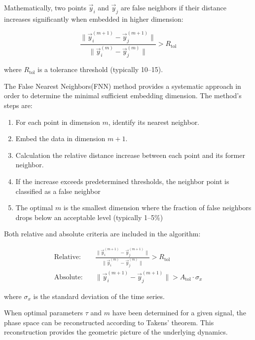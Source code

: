 \documentclass{article}
\begin{document}
			Mathematically, two points $\vec{y}_i$ and $\vec{y}_j$ are false neighbors if their distance increases significantly when embedded in higher dimension:

			\begin{equation}
			\frac{\|\vec{y}_i^{(m+1)} - \vec{y}_j^{(m+1)}\|}{\|\vec{y}_i^{(m)} - \vec{y}_j^{(m)}\|} > R_{\text{tol}}
			\end{equation}

			where $R_{\text{tol}}$ is a tolerance threshold (typically 10--15).

			The False Nearest Neighbors(FNN) method \cite{kennel1992} 
			provides a systematic approach in order to determine the 
			minimal sufficient embedding dimension. The method's steps are:

			\begin{enumerate}
			\item For each point in dimension $m$, identify its nearest neighbor.
			\item Embed the data in dimension $m+1$.
			\item Calculation the relative distance increase between each point and its former neighbor.
			\item If the increase exceeds predetermined thresholds, the neighbor point is classified as a false neighbor
			\item The optimal $m$ is the smallest dimension where the fraction of 
				false neighbors drops below an acceptable level (typically 1--5\%)
			\end{enumerate}

			Both relative and absolute criteria are included in the algorithm:

			\begin{align}
			\text{Relative:} &\quad \frac{\|\vec{y}_i^{(m+1)} - \vec{y}_j^{(m+1)}\|}{\|\vec{y}_i^{(m)} - \vec{y}_j^{(m)}\|} > R_{\text{tol}} \\
			\text{Absolute:} &\quad \|\vec{y}_i^{(m+1)} - \vec{y}_j^{(m+1)}\| > A_{\text{tol}} \cdot \sigma_x
			\end{align}

			where $\sigma_x$ is the standard deviation of the time series.
			



			When optimal parameters $\tau$ and $m$ have been determined for a given signal, 
			the phase space can be reconstructed according to Takens' theorem. This reconstruction provides the
			geometric picture of the underlying dynamics.
\end{document}
